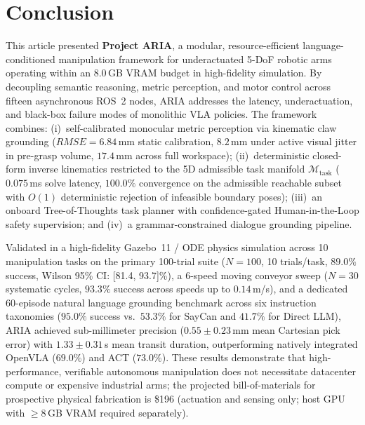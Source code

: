 \documentclass[journal]{IEEEtran}
\begin{document}
\enlargethispage{3\baselineskip}
\section{Conclusion}
\label{sec_conclusion}
This article presented \textbf{Project ARIA}, a modular, resource-efficient language-conditioned manipulation framework for underactuated 5-DoF robotic arms operating within an 8.0\,GB VRAM budget in high-fidelity simulation. By decoupling semantic reasoning, metric perception, and motor control across fifteen asynchronous ROS~2 nodes, ARIA addresses the latency, underactuation, and black-box failure modes of monolithic VLA policies. The framework combines: (i)~self-calibrated monocular metric perception via kinematic claw grounding ($RMSE = 6.84$\,mm static calibration, $8.2$\,mm under active visual jitter in pre-grasp volume, $17.4$\,mm across full workspace); (ii)~deterministic closed-form inverse kinematics restricted to the 5D admissible task manifold $\mathcal{M}_{\text{task}}$ ($0.075$\,ms solve latency, $100.0\%$ convergence on the admissible reachable subset with $O(1)$ deterministic rejection of infeasible boundary poses); (iii)~an onboard Tree-of-Thoughts task planner with confidence-gated Human-in-the-Loop safety supervision; and (iv)~a grammar-constrained dialogue grounding pipeline.

Validated in a high-fidelity Gazebo~11 / ODE physics simulation across 10 manipulation tasks on the primary 100-trial suite ($N=100$, 10 trials/task, $89.0\%$ success, Wilson 95\% CI: [81.4, 93.7]\%), a 6-speed moving conveyor sweep ($N=30$ systematic cycles, $93.3\%$ success across speeds up to $0.14$\,m/s), and a dedicated 60-episode natural language grounding benchmark across six instruction taxonomies ($95.0\%$ success vs.\ $53.3\%$ for SayCan and $41.7\%$ for Direct LLM), ARIA achieved sub-millimeter precision ($0.55 \pm 0.23$\,mm mean Cartesian pick error) with $1.33 \pm 0.31$\,s mean transit duration, outperforming natively integrated OpenVLA ($69.0\%$) and ACT ($73.0\%$). These results demonstrate that high-performance, verifiable autonomous manipulation does not necessitate datacenter compute or expensive industrial arms; the projected bill-of-materials for prospective physical fabrication is \$196 (actuation and sensing only; host GPU with $\ge 8$\,GB VRAM required separately).
\end{document}
